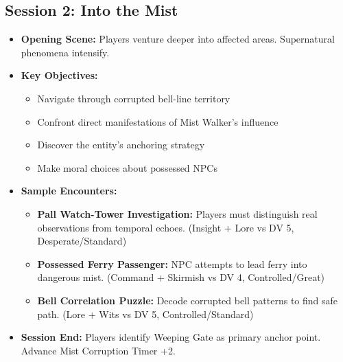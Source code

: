 \documentclass[11pt]{article}
\begin{document}
\subsection*{Session 2: Into the Mist}
\begin{itemize}
    \item \textbf{Opening Scene:} Players venture deeper into affected areas. Supernatural phenomena intensify.
    \item \textbf{Key Objectives:}
    \begin{itemize}
        \item Navigate through corrupted bell-line territory
        \item Confront direct manifestations of Mist Walker's influence
        \item Discover the entity's anchoring strategy
        \item Make moral choices about possessed NPCs
    \end{itemize}
    \item \textbf{Sample Encounters:}
    \begin{itemize}
        \item \textbf{Pall Watch-Tower Investigation:} Players must distinguish real observations from temporal echoes. (Insight + Lore vs DV 5, Desperate/Standard)
        \item \textbf{Possessed Ferry Passenger:} NPC attempts to lead ferry into dangerous mist. (Command + Skirmish vs DV 4, Controlled/Great)
        \item \textbf{Bell Correlation Puzzle:} Decode corrupted bell patterns to find safe path. (Lore + Wits vs DV 5, Controlled/Standard)
    \end{itemize}
    \item \textbf{Session End:} Players identify Weeping Gate as primary anchor point. Advance Mist Corruption Timer +2.
\end{itemize}
\end{document}
